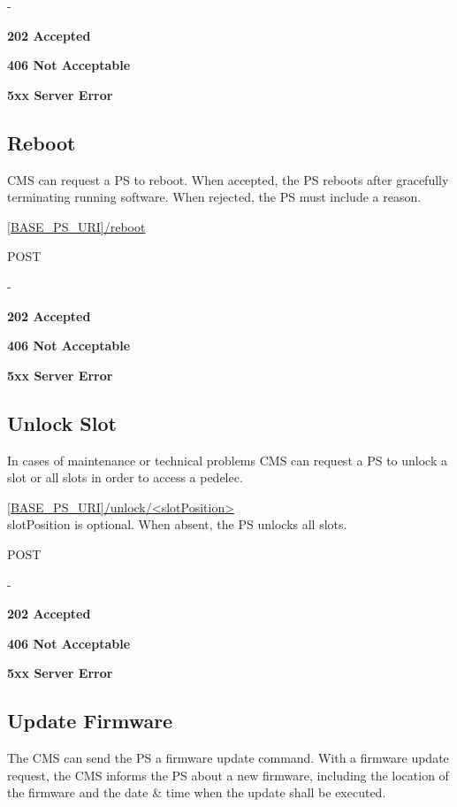  -

 \textbf{202 Accepted}

 \textbf{406 Not Acceptable}

\textbf{5xx Server Error}

\subsection{Reboot}

\acs{CMS} can request a \acs{PS} to reboot. When accepted, the \acs{PS} reboots after gracefully terminating running software. When rejected, the \acs{PS} must include a reason.

 \url{[BASE_PS_URI]/reboot}

 POST

 -

 \textbf{202 Accepted}

 \textbf{406 Not Acceptable}

\textbf{5xx Server Error}

\subsection{Unlock Slot}

In cases of maintenance or technical problems \acs{CMS} can request a \acs{PS} to unlock a slot or all slots in order to access a pedelec. 

 \url{[BASE_PS_URI]/unlock/<slotPosition>} \\
slotPosition is optional. When absent, the \acs{PS} unlocks all slots.

 POST

 -

 \textbf{202 Accepted}

 \textbf{406 Not Acceptable}

\textbf{5xx Server Error}

\subsection{Update Firmware}

The \acs{CMS} can send the \acs{PS} a firmware update command. With a firmware update request, the \acs{CMS} informs the \acs{PS} about a new firmware, including the location of the firmware and the date \& time when the update shall be executed.


